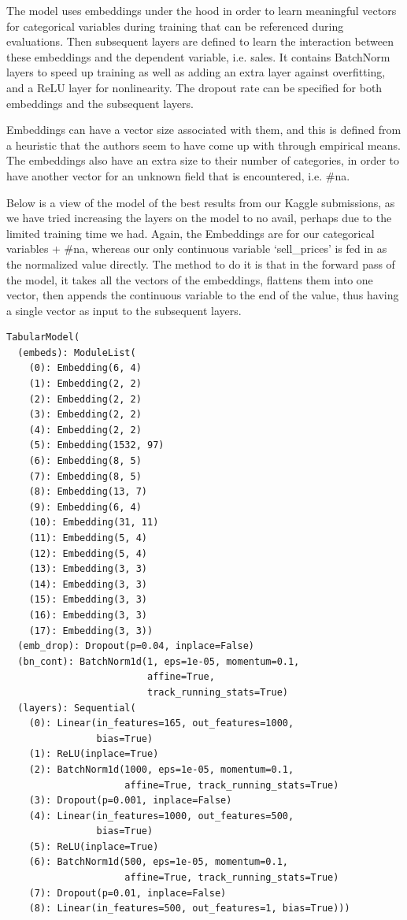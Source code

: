 \documentclass[10pt,twocolumn,letterpaper]{article}
\begin{document}
  The model uses embeddings under the hood in order to learn meaningful vectors
  for categorical variables during training that can be referenced during
  evaluations. Then subsequent layers are defined to learn the interaction
  between these embeddings and the dependent variable, i.e. sales. It contains
  BatchNorm layers to speed up training as well as adding an extra layer against
  overfitting, and a ReLU layer for nonlinearity. The dropout rate can be
  specified for both embeddings and the subsequent layers.

  Embeddings can have a vector size associated with them, and this is defined
  from a heuristic that the authors seem to have come up with through empirical
  means. The embeddings also have an extra size to their number of categories,
  in order to have another vector for an unknown field that is encountered, i.e.
  \#na.

  Below is a view of the model of the best results from our Kaggle submissions,
  as we have tried increasing the layers on the model to no avail, perhaps due
  to the limited training time we had. Again, the Embeddings are for our
  categorical variables + \#na, whereas our only continuous variable
  ‘sell\_prices' is fed in as the normalized value directly. The method to do it
  is that in the forward pass of the model, it takes all the vectors of the
  embeddings, flattens them into one vector, then appends the continuous
  variable to the end of the value, thus having a single vector as input to the
  subsequent layers.

{\scriptsize
\begin{verbatim}
TabularModel(
  (embeds): ModuleList(
    (0): Embedding(6, 4)
    (1): Embedding(2, 2)
    (2): Embedding(2, 2)
    (3): Embedding(2, 2)
    (4): Embedding(2, 2)
    (5): Embedding(1532, 97)
    (6): Embedding(8, 5)
    (7): Embedding(8, 5)
    (8): Embedding(13, 7)
    (9): Embedding(6, 4)
    (10): Embedding(31, 11)
    (11): Embedding(5, 4)
    (12): Embedding(5, 4)
    (13): Embedding(3, 3)
    (14): Embedding(3, 3)
    (15): Embedding(3, 3)
    (16): Embedding(3, 3)
    (17): Embedding(3, 3))
  (emb_drop): Dropout(p=0.04, inplace=False)
  (bn_cont): BatchNorm1d(1, eps=1e-05, momentum=0.1,
  						 affine=True,
  						 track_running_stats=True)
  (layers): Sequential(
    (0): Linear(in_features=165, out_features=1000,
                bias=True)
    (1): ReLU(inplace=True)
    (2): BatchNorm1d(1000, eps=1e-05, momentum=0.1,
                     affine=True, track_running_stats=True)
    (3): Dropout(p=0.001, inplace=False)
    (4): Linear(in_features=1000, out_features=500,
                bias=True)
    (5): ReLU(inplace=True)
    (6): BatchNorm1d(500, eps=1e-05, momentum=0.1,
                     affine=True, track_running_stats=True)
    (7): Dropout(p=0.01, inplace=False)
    (8): Linear(in_features=500, out_features=1, bias=True)))
\end{verbatim}
}
\end{document}
